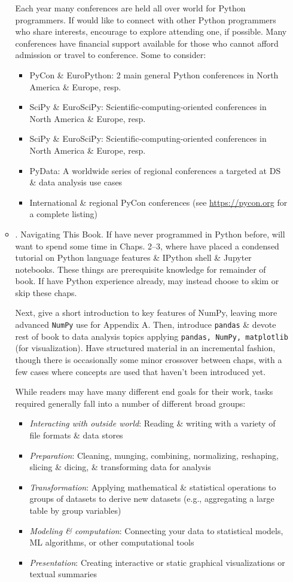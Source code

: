 \documentclass{article}
\begin{document}
\begin{itemize}
\begin{itemize}
		Each year many conferences are held all over world for Python programmers. If would like to connect with other Python programmers who share interests, encourage to explore attending one, if possible. Many conferences have financial support available for those who cannot afford admission or travel to conference. Some to consider:
		\begin{itemize}
			\item PyCon \& EuroPython: 2 main general Python conferences in North America \& Europe, resp.
			\item SciPy \& EuroSciPy: Scientific-computing-oriented conferences in North America \& Europe, resp.
			\item SciPy \& EuroSciPy: Scientific-computing-oriented conferences in North America \& Europe, resp.
			\item PyData: A worldwide series of regional conferences a targeted at DS \& data analysis use cases
			\item International \& regional PyCon conferences (see \url{https://pycon.org} for a complete listing)
		\end{itemize}
		\item {. Navigating This Book.} If have never programmed in Python before, will want to spend some time in Chaps. 2--3, where have placed a condensed tutorial on Python language features \& IPython shell \& Jupyter notebooks. These things are prerequisite knowledge for remainder of book. If have Python experience already, may instead choose to skim or skip these chaps.
		
		Next, give a short introduction to key features of NumPy, leaving more advanced {\tt NumPy} use for Appendix A. Then, introduce {\tt pandas} \& devote rest of book to data analysis topics applying {\tt pandas, NumPy, matplotlib} (for visualization). Have structured material in an incremental fashion, though there is occasionally some minor crossover between chaps, with a few cases where concepts are used that haven't been introduced yet.
		
		While readers may have many different end goals for their work, tasks required generally fall into a number of different broad groups:
		\begin{itemize}
			\item {\it Interacting with outside world}: Reading \& writing with a variety of file formats \& data stores
			\item {\it Preparation}: Cleaning, munging, combining, normalizing, reshaping, slicing \& dicing, \& transforming data for analysis
			\item {\it Transformation}: Applying mathematical \& statistical operations to groups of datasets to derive new datasets (e.g., aggregating a large table by group variables)
			\item {\it Modeling \& computation}: Connecting your data to statistical models, ML algorithms, or other computational tools
			\item {\it Presentation}: Creating interactive or static graphical visualizations or textual summaries
		\end{itemize}
		

\end{itemize}
\end{itemize}
\end{document}
